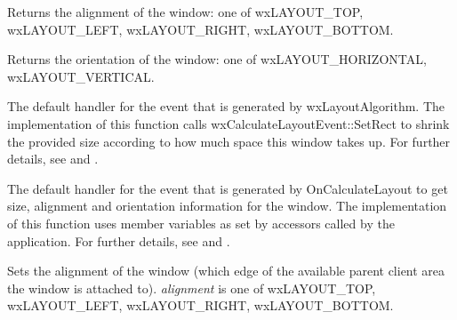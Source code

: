 


\label{wxsashlayoutwindowgetalignment}


Returns the alignment of the window: one of wxLAYOUT\_TOP, wxLAYOUT\_LEFT, wxLAYOUT\_RIGHT, wxLAYOUT\_BOTTOM.

\label{wxsashlayoutwindowgetorientation}


Returns the orientation of the window: one of wxLAYOUT\_HORIZONTAL, wxLAYOUT\_VERTICAL.

\label{wxsashlayoutwindowoncalculatelayout}


The default handler for the event that is generated by wxLayoutAlgorithm. The implementation
of this function calls wxCalculateLayoutEvent::SetRect to shrink the provided size according to
how much space this window takes up. For further details,
see  and .

\label{wxsashlayoutwindowonquerylayoutinfo}


The default handler for the event that is generated by OnCalculateLayout to get
size, alignment and orientation information for the window. The implementation
of this function uses member variables as set by accessors called by the application.
For further details, see  and .

\label{wxsashlayoutwindowsetalignment}


Sets the alignment of the window (which edge of the available parent client area the window
is attached to). {\it alignment} is one of wxLAYOUT\_TOP, wxLAYOUT\_LEFT, wxLAYOUT\_RIGHT, wxLAYOUT\_BOTTOM.

